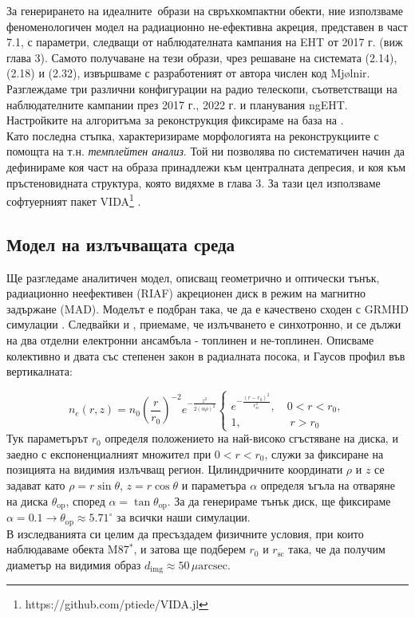 За генерирането на идеалните$\,$ образи на свръхкомпактни обекти, ние използваме феноменологичен модел на радиационно не-ефективна акреция, представен в част 7.1, с параметри, следващи от наблюдателната кампания на EHT от 2017 г. (виж глава 3). Самото получаване на тези образи, чрез решаване на системата (2.14), (2.18) и (2.32), извършваме с разработеният от автора числен код Mjølnir. \\

Разглеждаме три различни конфигурации на радио телескопи, съответстващи на наблюдателните кампании през 2017 г., 2022 г. и планувания ngEHT.\\

Настройките на алгоритъма за реконструкция фиксираме на база на \cite{EHTIM}.\\

Като последна стъпка, характеризираме морфологията на реконструкциите с помощта на т.н. \emph{темплейтен анализ}. Той ни позволява по систематичен начин да дефинираме коя част на образа принадлежи към централната депресия, и коя към пръстеновидната структура, която видяхме в глава 3. За тази цел използваме софтуерният пакет VIDA\footnote{https://github.com/ptiede/VIDA.jl} \cite{VIDA}.

\subsection{Модел на излъчващата среда}

Ще разгледаме аналитичен модел, описващ геометрично и оптически тънък, радиационно неефективен (RIAF) акреционен диск в режим на магнитно задържане (MAD). Моделът е подбран така, че да е качествено сходен с GRMHD симулации \cite{Yuan2003}. Следвайки \cite{Broderick2021} и \cite{Gold2020}, приемаме, че излъчването е синхотронно, и се дължи на два отделни електронни ансамбъла - топлинен и не-топлинен. Описваме колективно и двата със степенен закон в радиалната посока, и Гаусов профил във вертикалната:

\begin{equation}
	n_e(r,z) = n_0\left(\frac{r}{r_0}\right)^{-2}e^{-\frac{z^2}{2(\alpha\rho)^2}}
	\begin{cases}
		e^{-\frac{(r-r_0)^2}{r^2_{\text{sc}}}},\quad 0 < r < r_0,\\
		1,\,\,\qquad\qquad r>r_0
	\end{cases}
\end{equation}
Тук параметърът $r_0$ определя положението на най-високо сгъстяване на диска, и заедно с експоненциалният множител при $0 < r < r_0$, служи за фиксиране на позицията на видимия излъчващ регион. Цилиндричните координати $\rho$ и $z$ се задават като $\rho = r\sin\theta$, $z = r\cos\theta$ и параметъра $\alpha$ определя ъгъла на отваряне на диска $\theta_{\text{op}}$, според $\alpha = \tan\theta_\text{op}$. За да генерираме тънък диск, ще фиксираме $\alpha = 0.1 \rightarrow \theta_{\text{op}}\approx 5.71^\circ$ за всички наши симулации.\\
В изследванията си целим да пресъздадем физичните условия, при които наблюдаваме обекта M87$^*$, и затова ще подберем $r_0$ и $r_\text{sc}$ така, че да получим диаметър на видимия образ $d_\text{img}\approx 50\, \mu\text{arcsec}$.\\

